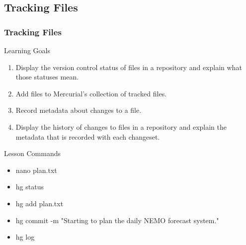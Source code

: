 \documentclass{beamer}
\begin{document}
\subsection*{Tracking Files}
\begin{frame}
\frametitle{Tracking Files}
\begin{block}{Learning Goals}
\begin{enumerate}
\item Display the version control status of files in a repository and explain what those statuses mean.
\item Add files to Mercurial's collection of tracked files.
\item Record metadata about changes to a file.
\item Display the history of changes to files in a repository and explain the metadata that is recorded with each changeset.
\end{enumerate}
\end{block}
\begin{block}{Lesson Commands}
\begin{multicols}{2}
\begin{itemize}
\item nano plan.txt
\item hg status
\item hg add plan.txt
\item hg commit -m "Starting to plan the daily NEMO forecast system."
\item hg log
\end{itemize}
\end{multicols}
\end{block}
\end{frame}
\end{document}
